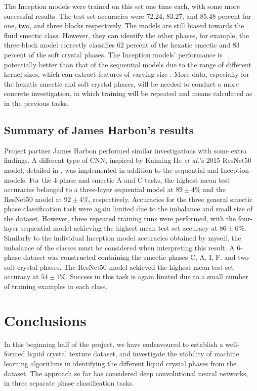 \documentclass[12pt]{article}
\begin{document}
The Inception models were trained on this set one time each, with some more successful results. The test set accuracies were 72.24, 83.27, and 85.48 percent for one, two, and three blocks respectively. The models are still biased towards the fluid smectic class. However, they can identify the other phases, for example, the three-block model correctly classifies 62 percent of the hexatic smectic and 83 percent of the soft crystal phases. The Inception models' performance is potentially better than that of the sequential models due to the range of different kernel sizes, which can extract features of varying size \cite{Aghdam17}. More data, especially for the hexatic smectic and soft crystal phases, will be needed to conduct a more concrete investigation, in which training will be repeated and means calculated as in the previous tasks.
\subsection{Summary of James Harbon's results}
Project partner James Harbon performed similar investigations with some extra findings. A different type of CNN, inspired by Kaiming He \textit{et al.}'s 2015 ResNet50 model, detailed in \cite{He16}, was implemented in addition to the sequential and Inception models. For the 4-phase and smectic A and C tasks, the highest mean test accuracies belonged to a three-layer sequential model at $89\pm4$\% and the ResNet50 model at $92\pm4$\%, respectively. Accuracies for the three general smectic phase classification task were again limited due to the imbalance and small size of the dataset. However, three repeated training runs were performed, with the four-layer sequential model achieving the highest mean test set accuracy at $86\pm6$\%. Similarly to the individual Inception model accuracies obtained by myself, the imbalance of the classes must be considered when interpreting this result. A 6-phase dataset was constructed containing the smectic phases C, A, I, F, and two soft crystal phases. The ResNet50 model achieved the highest mean test set accuracy at $54\pm1$\%. Success in this task is again limited due to a small number of training examples in each class.  
\section{Conclusions}
In this beginning half of the project, we have endeavoured to establish a well-formed liquid crystal texture dataset, and investigate the viability of machine learning algorithms in identifying the different liquid crystal phases from the dataset. The approach so far has considered deep convolutional neural networks, in three separate phase classification tasks. 
\end{document}

